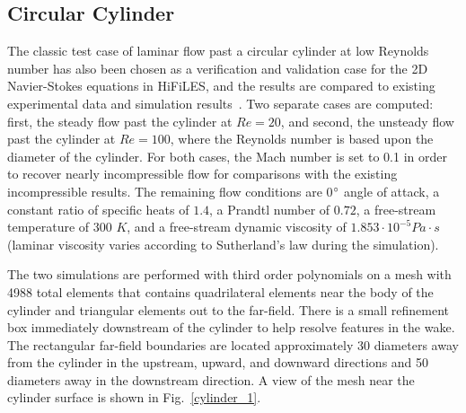 \graphicspath{{figures_cylinder/}}%

\subsection{Circular Cylinder}

The classic test case of laminar flow past a circular cylinder at low Reynolds number has also been chosen as a verification and validation case for the 2D Navier-Stokes equations in HiFiLES, and the results are compared to existing experimental data and simulation results~\cite{park1998}. Two separate cases are computed: first, the steady flow past the cylinder at $Re = 20$, and second, the unsteady flow past the cylinder at $Re = 100$, where the Reynolds number is based upon the diameter of the cylinder. For both cases, the Mach number is set to 0.1 in order to recover nearly incompressible flow for comparisons with the existing incompressible results. The remaining flow conditions are 0$^{\circ}$ angle of attack, a constant ratio of specific heats of $1.4$, a Prandtl number of $0.72$, a free-stream temperature of 300 $K$, and a free-stream dynamic viscosity of $1.853\cdot 10^{-5} Pa \cdot s$ (laminar viscosity varies according to Sutherland's law during the simulation).

The two simulations are performed with third order polynomials on a mesh with 4988 total elements that contains quadrilateral elements near the body of the cylinder and triangular elements out to the far-field. There is a small refinement box immediately downstream of the cylinder to help resolve features in the wake. The rectangular far-field boundaries are located approximately 30 diameters away from the cylinder in the upstream, upward, and downward directions and 50 diameters away in the downstream direction. A view of the mesh near the cylinder surface is shown in Fig.~\ref{cylinder_1}.


